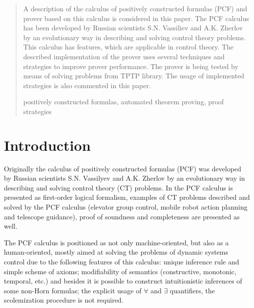 \documentclass[runningheads,a4paper]{llncs}
\newcommand{\keywords}[1]{\par\addvspace\baselineskip
\noindent\keywordname\enspace\ignorespaces#1}
\begin{document}
\begin{abstract}
A description of the calculus of positively constructed formulas (PCF) and prover based on this calculus is considered in this paper. The PCF calculus has been developed by Russian scientists S.N. Vassiliev and A.K. Zherlov by an evolutionary way in describing and solving control theory problems. This calculus has features, which are applicable in control theory. The described implementation of the prover uses several techniques and strategies to improve prover performance. The prover is being tested by means of solving problems from TPTP library. The usage of implemented strategies is also commented in this paper.
\keywords{positively constructed formulas, automated theorem proving, proof strategies}
\end{abstract}



\section{Introduction}

Originally \cite{SNV1990,ICDS2000} the calculus of positively constructed formulas (PCF) was developed by Russian scientists S.N. Vassilyev and A.K. Zherlov by an evolutionary way in describing and solving control theory (CT) problems. In \cite{ICDS2000} the PCF calculus is presented as first-order logical formalism, examples of CT problems described  and solved by the PCF calculus (elevator group control, mobile robot action planning and telescope guidance), proof of soundness and completeness are presented as well.

The PCF calculus is positioned as not only machine-oriented, but also as a human-oriented, mostly aimed at solving the problems of dynamic systems control due to the following features of this calculus: unique inference rule and simple scheme of axioms; modifiability of semantics (constructive, monotonic, temporal, etc.) and besides it is possible to construct intuitionistic inferences of some non-Horn formulas; the explicit usage of $\forall$ and $\exists$ quantifiers, the scolemization procedure is not required.
\end{document}
